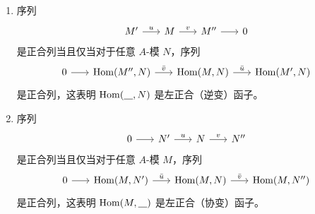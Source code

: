 \begin{proposition}\label{prop:hom functor and exact sequence}
  \mbox{}
  \begin{enumerate}
    \item 序列
    \[
      \begin{tikzcd}[column sep=scriptsize]
        M'\arrow[r,"u"] & M\arrow[r,"v"] & M''\arrow[r] & 0
      \end{tikzcd}  
    \]
    是正合列当且仅当对于任意 $A$-模 $N$，序列
    \[
      \begin{tikzcd}[column sep=scriptsize]
        0\arrow[r] & \Hom(M'',N)\arrow[r,"\bar v"] &
        \Hom(M,N) \arrow[r,"\bar u"] & \Hom(M',N)
      \end{tikzcd}  
    \]
    是正合列，这表明 $\Hom(\uline,N)$ 是左正合（逆变）函子。
    \item 序列
    \[
      \begin{tikzcd}[column sep=scriptsize]
        0\arrow[r] & N'\arrow[r,"u"] & N\arrow[r,"v"] &
        N''
      \end{tikzcd}  
    \]
    是正合列当且仅当对于任意 $A$-模 $M$，序列
    \[
      \begin{tikzcd}[column sep=scriptsize]
        0\arrow[r] & \Hom(M,N')\arrow[r,"\bar u"] &
        \Hom(M,N)\arrow[r,"\bar v"] & \Hom(M,N'')
      \end{tikzcd}  
    \]
    是正合列，这表明 $\Hom(M,\uline)$ 是左正合（协变）函子。
  \end{enumerate}
\end{proposition}
